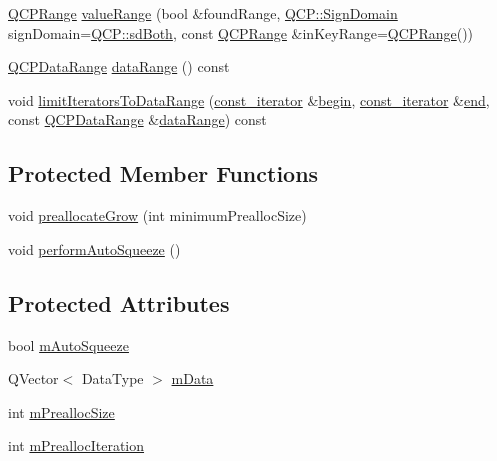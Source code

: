 \begin{DoxyCompactItemize}
\item 
\mbox{\hyperlink{class_q_c_p_range}{Q\+C\+P\+Range}} \mbox{\hyperlink{class_q_c_p_data_container_a35a102dc2424d1228fc374d9313efbe9}{value\+Range}} (bool \&found\+Range, \mbox{\hyperlink{namespace_q_c_p_afd50e7cf431af385614987d8553ff8a9}{Q\+C\+P\+::\+Sign\+Domain}} sign\+Domain=\mbox{\hyperlink{namespace_q_c_p_afd50e7cf431af385614987d8553ff8a9aa38352ef02d51ddfa4399d9551566e24}{Q\+C\+P\+::sd\+Both}}, const \mbox{\hyperlink{class_q_c_p_range}{Q\+C\+P\+Range}} \&in\+Key\+Range=\mbox{\hyperlink{class_q_c_p_range}{Q\+C\+P\+Range}}())
\item 
\mbox{\hyperlink{class_q_c_p_data_range}{Q\+C\+P\+Data\+Range}} \mbox{\hyperlink{class_q_c_p_data_container_aece90eeb2ba8d3c46d3d94023630fbc7}{data\+Range}} () const
\item 
void \mbox{\hyperlink{class_q_c_p_data_container_aa1b36f5ae86a5a5a0b92141d3a0945c4}{limit\+Iterators\+To\+Data\+Range}} (\mbox{\hyperlink{class_q_c_p_data_container_ae40a91f5cb0bcac61d727427449b7d15}{const\+\_\+iterator}} \&\mbox{\hyperlink{class_q_c_p_data_container_a80032518413ab8f418f7c81182fd06cb}{begin}}, \mbox{\hyperlink{class_q_c_p_data_container_ae40a91f5cb0bcac61d727427449b7d15}{const\+\_\+iterator}} \&\mbox{\hyperlink{class_q_c_p_data_container_acf66dfad83fe041380f5e0491e7676f2}{end}}, const \mbox{\hyperlink{class_q_c_p_data_range}{Q\+C\+P\+Data\+Range}} \&\mbox{\hyperlink{class_q_c_p_data_container_aece90eeb2ba8d3c46d3d94023630fbc7}{data\+Range}}) const
\end{DoxyCompactItemize}
\subsection*{Protected Member Functions}
\begin{DoxyCompactItemize}
\item 
void \mbox{\hyperlink{class_q_c_p_data_container_aae8cdb2bcc3b900ec22f26df3e7d67c7}{preallocate\+Grow}} (int minimum\+Prealloc\+Size)
\item 
void \mbox{\hyperlink{class_q_c_p_data_container_a83c25ac14be1c920df85e797ee75c982}{perform\+Auto\+Squeeze}} ()
\end{DoxyCompactItemize}
\subsection*{Protected Attributes}
\begin{DoxyCompactItemize}
\item 
bool \mbox{\hyperlink{class_q_c_p_data_container_aae64c517d64511ad7a81ff8ee7b29147}{m\+Auto\+Squeeze}}
\item 
Q\+Vector$<$ Data\+Type $>$ \mbox{\hyperlink{class_q_c_p_data_container_a74906b4da829849c4062b5337c72585d}{m\+Data}}
\item 
int \mbox{\hyperlink{class_q_c_p_data_container_a3554d3ad00e69f7ce057efa00ea6f4b2}{m\+Prealloc\+Size}}
\item 
int \mbox{\hyperlink{class_q_c_p_data_container_ab2115bf023c29691f441eaf1889de84a}{m\+Prealloc\+Iteration}}
\end{DoxyCompactItemize}
